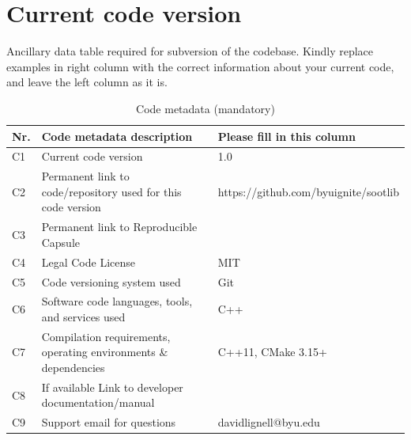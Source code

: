 \documentclass[preprint,letterpaper]{elsarticle}
\begin{document}
\section*{Current code version}

Ancillary data table required for subversion of the codebase. Kindly replace examples in right column with the correct information about your current code, and leave the left column as it is.

\begin{table}
\begin{tabular}{|l|p{6.5cm}|p{6.5cm}|}
\hline
\textbf{Nr.} & \textbf{Code metadata description} & \textbf{Please fill in this column} \\
\hline
C1 & Current code version & 1.0 \\
\hline
C2 & Permanent link to code/repository used for this code version & https://github.com/byuignite/sootlib \\
\hline
C3  & Permanent link to Reproducible Capsule & \\
\hline
C4 & Legal Code License & MIT \\
\hline
C5 & Code versioning system used & Git \\
\hline
C6 & Software code languages, tools, and services used & C++ \\
\hline
C7 & Compilation requirements, operating environments \& dependencies & C++11, CMake 3.15+\\
\hline
C8 & If available Link to developer documentation/manual &  \\
\hline
C9 & Support email for questions & davidlignell@byu.edu \\
\hline
\end{tabular}
\caption{Code metadata (mandatory)}
\end{table}
\end{document}
